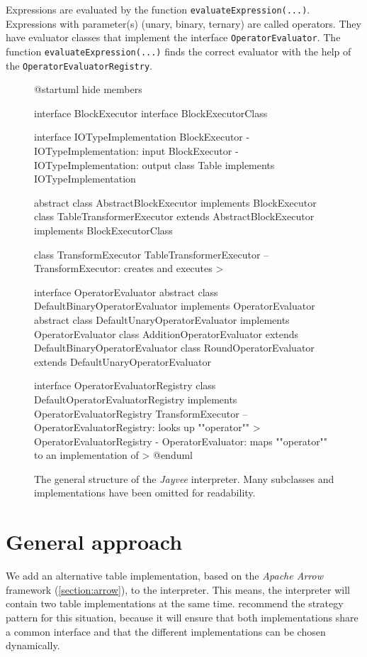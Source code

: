 \begin{minipage}{\linewidth}
	Expressions are evaluated by the function \Verb|evaluateExpression(...)|.
	Expressions with parameter(s) (unary, binary, ternary) are called operators.
	They have evaluator classes that implement the interface \Verb|OperatorEvaluator|.
	The function \Verb|evaluateExpression(...)| finds the correct evaluator with the help of the \Verb|OperatorEvaluatorRegistry|.
\end{minipage}

\begin{figure}
	\begin{plantuml}
		@startuml
		hide members

		interface BlockExecutor
		interface BlockExecutorClass

		interface IOTypeImplementation
		BlockExecutor  -  IOTypeImplementation: input
		BlockExecutor - IOTypeImplementation: output
		class Table implements IOTypeImplementation

		abstract class AbstractBlockExecutor implements BlockExecutor
		class TableTransformerExecutor extends AbstractBlockExecutor implements BlockExecutorClass

		class TransformExecutor
		TableTransformerExecutor -- TransformExecutor: creates and executes >

		interface OperatorEvaluator
		abstract class DefaultBinaryOperatorEvaluator implements OperatorEvaluator
		abstract class DefaultUnaryOperatorEvaluator implements OperatorEvaluator
		class AdditionOperatorEvaluator extends DefaultBinaryOperatorEvaluator
		class RoundOperatorEvaluator extends DefaultUnaryOperatorEvaluator

		interface OperatorEvaluatorRegistry
		class DefaultOperatorEvaluatorRegistry implements OperatorEvaluatorRegistry
		TransformExecutor -- OperatorEvaluatorRegistry: looks up ""operator"" >
		OperatorEvaluatorRegistry - OperatorEvaluator: maps ""operator"" to an implementation of >
		@enduml
	\end{plantuml}
	\caption{The general structure of the \emph{Jayvee} interpreter.
		Many subclasses and implementations have been omitted for readability.}
	\label{fig:uml:overview}
\end{figure}


\section{General approach}
\label{section:General Idea}
We add an alternative table implementation, based on the \emph{Apache Arrow} framework (\autoref{section:arrow}), to the interpreter.
This means, the interpreter will contain two table implementations at the same time.
\textcite{Dooley2024} recommend the strategy pattern for this situation, because it will ensure that both implementations share a common interface and that the different implementations can be chosen dynamically.

